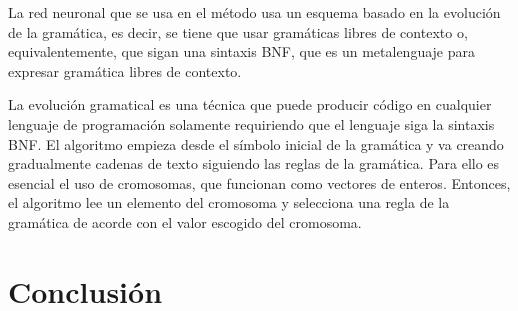 \documentclass{article}
\theoremstyle{theorem-style}  %
\theoremstyle{definition-style}
\theoremstyle{example-style}
\begin{document}
La red neuronal que se usa en el método usa un esquema basado en la evolución de la gramática, es decir, se tiene que usar gramáticas libres de contexto o, equivalentemente, que sigan una sintaxis BNF, que es un metalenguaje para expresar gramática libres de contexto.

La evolución gramatical es una técnica que puede producir código en cualquier lenguaje de programación solamente requiriendo que el lenguaje siga la sintaxis BNF. El algoritmo empieza desde el símbolo inicial de la gramática y va creando gradualmente cadenas de texto siguiendo las reglas de la gramática. Para ello  es esencial el uso de cromosomas, que funcionan como vectores de enteros. Entonces, el algoritmo lee un elemento del cromosoma y selecciona una regla de la gramática de acorde con el valor escogido del cromosoma.



\section{Conclusión} \label{sec:conclusion}



\printbibliography
\end{document}
